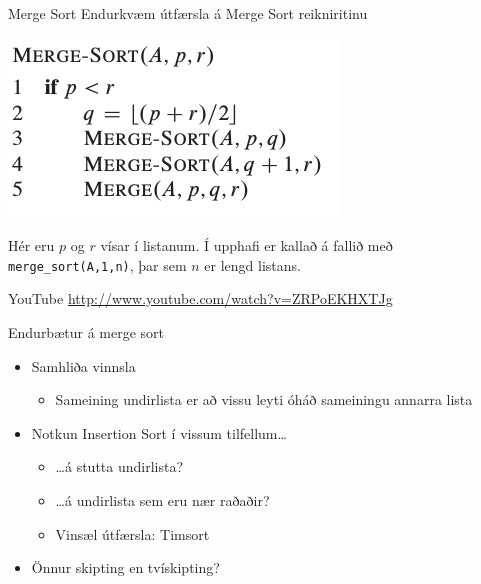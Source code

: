 \documentclass{beamer}
\begin{document}
\begin{frame}{Merge Sort}
Endurkvæm útfærsla á Merge Sort reikniritinu
\begin{center}
\includegraphics[scale=0.5]{Pics/merge-sort}
\end{center}
Hér eru $p$ og $r$ vísar í listanum. Í upphafi er kallað á fallið með \texttt{merge\_sort(A,1,n)}, þar sem $n$ er lengd listans.
\end{frame}

\begin{frame}{YouTube}
\url{http://www.youtube.com/watch?v=ZRPoEKHXTJg}
\end{frame}

\begin{frame}{Endurbætur á merge sort}
\begin{itemize}
 \item Samhliða vinnsla
 \begin{itemize}
  \item Sameining undirlista er að vissu leyti óháð sameiningu annarra lista 
 \end{itemize}
 \item Notkun Insertion Sort í vissum tilfellum\ldots
 \begin{itemize}
  \item \ldots á stutta undirlista?
  \item \ldots á undirlista sem eru nær raðaðir?
  \item Vinsæl útfærsla: Timsort
 \end{itemize}
 \item Önnur skipting en tvískipting?
\end{itemize}
\end{frame}
\end{document}
